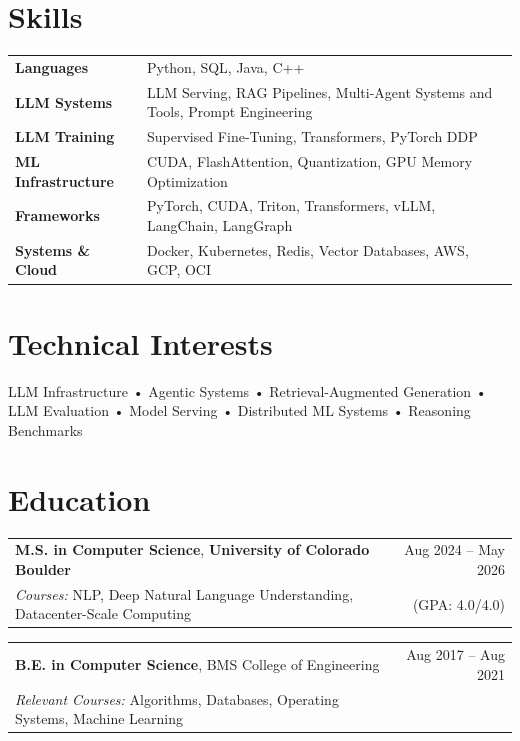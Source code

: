 \documentclass[a4paper,11pt]{article}
\begin{document}
\section{Skills}
\color{black}

\begin{tabularx}{\linewidth}{@{}l X@{}}
  \textbf{Languages} & Python, SQL, Java, C++ \\
  \textbf{LLM Systems} & LLM Serving, RAG Pipelines, Multi-Agent Systems and Tools, Prompt Engineering \\
  \textbf{LLM Training} & Supervised Fine-Tuning, Transformers, PyTorch DDP \\
  \textbf{ML Infrastructure} & CUDA, FlashAttention, Quantization, GPU Memory Optimization \\
  \textbf{Frameworks} & PyTorch, CUDA, Triton, Transformers, vLLM, LangChain, LangGraph \\
  \textbf{Systems \& Cloud} & Docker, Kubernetes, Redis, Vector Databases, AWS, GCP, OCI

\end{tabularx}

\color{BlueViolet}
\section*{Technical Interests}
\color{black}
LLM Infrastructure • Agentic Systems • Retrieval-Augmented Generation • LLM Evaluation • Model Serving • Distributed ML Systems • Reasoning Benchmarks

\color{BlueViolet}
\section*{Education}
\color{black}
\begin{tabularx}{\linewidth}{@{}X r@{}}
  \textbf{M.S. in Computer Science}, \textbf{University of Colorado Boulder} & Aug 2024 -- May 2026 \\
  \textit{Courses:} NLP, Deep Natural Language Understanding, Datacenter-Scale Computing & (GPA: 4.0/4.0)
\end{tabularx}
\begin{tabularx}{\linewidth}{@{}X r@{}}
  \textbf{B.E. in Computer Science}, BMS College of Engineering & Aug 2017 – Aug 2021 \\
  \textit{Relevant Courses:} Algorithms, Databases, Operating Systems, Machine Learning
\end{tabularx}
\end{document}
